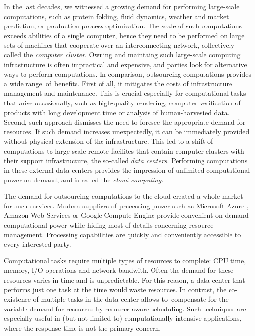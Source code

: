 \indent
In the last decades, we witnessed a growing demand for performing large-scale
computations, such as protein folding, fluid dynamics, weather and market prediction, or production process optimization.
The scale of such computations exceeds abilities of a single computer, hence they need to be performed on large sets of machines that cooperate over an interconnecting network, collectively called the \emph{computer cluster}.
Owning and maintaing such large-scale computing infrastructure is often impractical and expensive, and parties look for alternative ways to perform computations.
In comparison, outsourcing computations provides a wide range~of~benefits.
First of all, it mitigates the costs of infrastructure management and maintenance.
This is crucial especially for computational tasks that arise occasionally, such as high-quality rendering, computer verification of products with long development time or analysis of human-harvested data.
Second, such approach dismisses the need to foresee the appropriate demand for resources.
If such demand increases unexpectedly, it can be immediately provided without physical extension of the infrastructure.
This led to a shift of computations to large-scale remote facilites that contain computer clusters with their support infrastructure, the so-called \emph{data centers}.
Performing computations in these external data centers provides the impression of unlimited computational power on demand, and is called the \emph{cloud computing}.

The demand for outsourcing computations to the cloud created a whole market for such services.
Modern suppliers of processing power such as Microsoft Azure \cite{url-azure}, Amazon Web Services \cite{url-amazon-ec2} or Google Compute Engine \cite{url-gce} provide convenient on-demand computational power while hiding most of details concerning resource management.
Processing capabilities are quickly and conveniently accessible to every interested party.

Computational tasks require multiple types of resources to complete: CPU time, memory, I/O operations and network bandwith.
Often the demand for these resources varies in time and is unpredictable.
For this reason, a data center that performs just one task at the time would waste resources.
In contrast, the co-existence of multiple tasks in the data center allows to~compensate for the variable demand for resources by resource-aware scheduling.
Such techniques are especially useful in (but not limited to) computationally-intensive applications, where the response time is not the primary concern.

